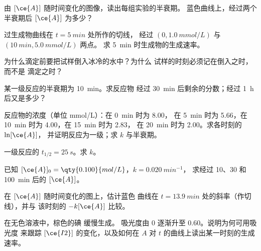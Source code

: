 \begin{exercise}[$\star$]\label{exo:g12:reaction-rates:2}
由 $[\ce{A}]$ 随时间变化的图像，读出每组实验的半衰期。
蓝色曲线上，经过两个半衰期后 $[\ce{A}]$ 为多少？
\end{exercise}

\begin{exercise}[$\star$]\label{exo:g12:reaction-rates:3}
过生成物曲线在 $t = \qty{5}{min}$ 处所作的切线，
经过 $(0, \qty{1.0}{mmol/L})$ 与 $(\qty{10}{min}, \qty{5.0}{mmol/L})$ 两点。
求 \qty{5}{min} 时生成物的生成速率。
\end{exercise}

\begin{exercise}[$\star$]\label{exo:g12:reaction-rates:4}
为什么滴定前要把试样倒入冰冷的水中？为什么
试样的时刻必须记在倒入之时，而不是
滴定之时？
\end{exercise}

\begin{exercise}[$\star$]\label{exo:g12:reaction-rates:5}
某一级反应的半衰期为 \qty{10}{min}。求反应物
经过 \qty{30}{min} 后剩余的分数；经过 \qty{1}{h} 后又是多少？
\end{exercise}

\begin{exercise}[$\star\star$]\label{exo:g12:reaction-rates:6}
反应物的浓度（单位 \si{mmol/L}）：在 \qty{0}{min} 时为 8.00，
在 \qty{5}{min} 时为 5.66，在 \qty{10}{min} 时为 4.00，在 \qty{15}{min} 时为 2.83，
在 \qty{20}{min} 时为 2.00。求各时刻的 $\ln[\ce{A}]$，
并证明反应为一级；求 $k$ 与半衰期。
\end{exercise}

\begin{exercise}[$\star\star$]\label{exo:g12:reaction-rates:7}
一级反应的 $t_{1/2} = \qty{25}{s}$。求 $k$。
\end{exercise}

\begin{exercise}[$\star\star$]\label{exo:g12:reaction-rates:8}
已知 $[\ce{A}]_0 = \qty{0.100}{mol/L}$，$k = \qty{0.020}{min^{-1}}$，
求经过 10、30 和 \qty{100}{min} 后的 $[\ce{A}]$。
\end{exercise}

\begin{exercise}[$\star\star$]\label{exo:g12:reaction-rates:9}
在 $[\ce{A}]$ 随时间变化的图上，估计蓝色
曲线在 $t = \qty{13.9}{min}$ 处的斜率（作切线），并与
该时刻的 $-k[\ce{A}]$ 比较。
\end{exercise}

\begin{exercise}[$\star\star$]\label{exo:g12:reaction-rates:10}
在无色溶液中，棕色的碘  缓慢生成。
吸光度由 0 逐渐升至 0.60。说明为何可用吸光度
来跟踪 $[\ce{I2}]$ 的变化，以及如何在
$A$ 对 $t$ 的曲线上读出某一时刻的生成速率。
\end{exercise}

